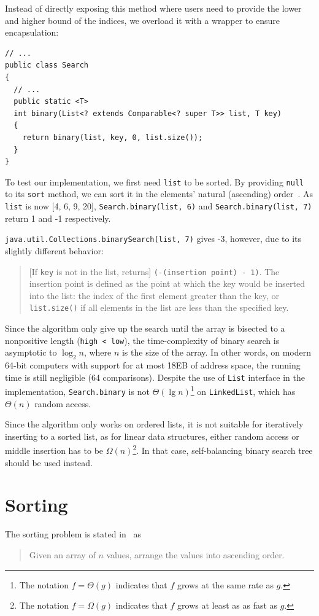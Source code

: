 \documentclass[a4paper,12pt]{article}
\begin{document}
Instead of directly exposing this method where users need to provide
the lower and higher bound of the indices, we overload it with a wrapper
to ensure encapsulation:
\begin{verbatim}
// ...
public class Search
{
  // ...
  public static <T>
  int binary(List<? extends Comparable<? super T>> list, T key)
  {
    return binary(list, key, 0, list.size());
  }
}
\end{verbatim}

To test our implementation, we first need \verb|list| to be sorted.
By providing \verb|null| to its \verb|sort| method, we can sort it
in the elements' natural (ascending) order~\cite[sort]{list}.
As \verb|list| is now [4, 6, 9, 20], \verb|Search.binary(list, 6)|
and \verb|Search.binary(list, 7)| return 1 and -1 respectively.

\verb|java.util.Collections.binarySearch(list, 7)| gives -3, however,
due to its slightly different behavior:
\begin{quote}
  [If \verb|key| is not in the list, returns] \verb|(-(insertion point) - 1)|.
  The insertion point is defined as the point at which the key would be
  inserted into the list: the index of the first element greater than the key,
  or \verb|list.size()| if all elements in the list are less than
  the specified key.~\cite[binarySearch]{collections}
\end{quote}

Since the algorithm only give up the search until the array is bisected to
a nonpositive length (\verb|high < low|), the time-complexity of binary search
is asymptotic to $\log_2 n$, where $n$ is the size of the array.
In other words, on modern 64-bit computers with support for at most 18EB
of address space, the running time is still negligible (64 comparisons).
Despite the use of \verb|List| interface in the implementation,
\verb|Search.binary| is not $\Theta(\lg n)$\footnote{The notation
$f = \Theta(g)$ indicates that $f$ grows at the same rate as $g$.}
on \verb|LinkedList|, which has $\Theta(n)$ random access.

Since the algorithm only works on ordered lists, it is not
suitable for iteratively inserting to a sorted list, as for linear
data structures, either random access or middle insertion has to be
$\Omega(n)$\footnote{The notation $f = \Omega(g)$ indicates that $f$ grows at
least as as fast as $g$.}.  In that case, self-balancing binary search tree
should be used instead.
\pagebreak

\section{Sorting}
The sorting problem is stated in~\cite[p. 638]{wu} as
\begin{quote}
  Given an array of $n$ values, arrange the values into ascending order.
\end{quote}
\end{document}
